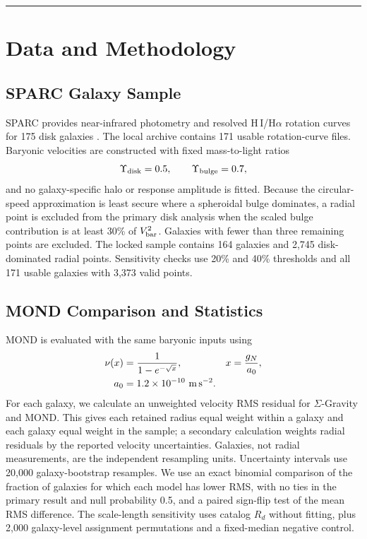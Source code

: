 \documentclass[aps,prd,reprint,superscriptaddress,showpacs,floatfix,longbibliography]{revtex4-2}
\begin{document}
\medskip\hrule\medskip

\section{Data and Methodology}

\subsection{SPARC Galaxy Sample}

SPARC provides near-infrared photometry and resolved H\,I/H$\alpha$ rotation curves for 175 disk galaxies \cite{ref7}. The local archive contains 171 usable rotation-curve files. Baryonic velocities are constructed with fixed mass-to-light ratios
\begin{equation}
\Upsilon_{\rm disk}=0.5,\qquad
\Upsilon_{\rm bulge}=0.7,
\label{eq:ml}
\end{equation}
and no galaxy-specific halo or response amplitude is fitted. Because the circular-speed approximation is least secure where a spheroidal bulge dominates, a radial point is excluded from the primary disk analysis when the scaled bulge contribution is at least 30\% of $V_{\rm bar}^2$. Galaxies with fewer than three remaining points are excluded. The locked sample contains 164 galaxies and 2,745 disk-dominated radial points. Sensitivity checks use 20\% and 40\% thresholds and all 171 usable galaxies with 3,373 valid points.

\subsection{MOND Comparison and Statistics}

MOND is evaluated with the same baryonic inputs using
\begin{equation}
\begin{aligned}
\nu(x)&=\frac{1}{1-e^{-\sqrt{x}}},&
x&=\frac{g_N}{a_0},\\
a_0&=1.2\times10^{-10}\ {\rm m\,s^{-2}}.&&
\end{aligned}
\label{eq:mond}
\end{equation}
For each galaxy, we calculate an unweighted velocity RMS residual for $\Sigma$-Gravity and MOND. This gives each retained radius equal weight within a galaxy and each galaxy equal weight in the sample; a secondary calculation weights radial residuals by the reported velocity uncertainties. Galaxies, not radial measurements, are the independent resampling units. Uncertainty intervals use 20,000 galaxy-bootstrap resamples. We use an exact binomial comparison of the fraction of galaxies for which each model has lower RMS, with no ties in the primary result and null probability 0.5, and a paired sign-flip test of the mean RMS difference. The scale-length sensitivity uses catalog $R_d$ without fitting, plus 2,000 galaxy-level assignment permutations and a fixed-median negative control.
\end{document}
